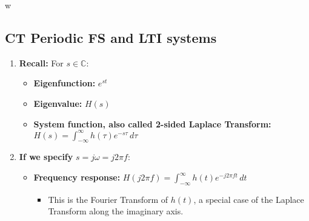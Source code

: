 w\subsection{CT Periodic FS and LTI systems}
\begin{definition}
    
\end{definition}

\begin{derivation}
    \begin{enumerate}
        \item \textbf{Recall:} For \( s \in \mathbb{C} \):

        \begin{center}
        \end{center}
        \begin{itemize}
            \item \textbf{Eigenfunction:} $e^{st}$
            \item \textbf{Eigenvalue:} $H(s)$
            \item \textbf{System function, also called 2-sided Laplace Transform:} $H(s) = \int_{-\infty}^{\infty} h(\tau) e^{-s \tau} \, d\tau$ 
        \end{itemize}

        \item \textbf{If we specify} \( s = j \omega = j 2 \pi f \):

        \begin{center}
        \end{center}
        \begin{itemize}
            \item \textbf{Frequency response:} $H(j 2 \pi f) = \int_{-\infty}^{\infty} h(t) e^{-j 2 \pi f t} \, dt$
            \begin{itemize}
                \item This is the Fourier Transform of \( h(t) \), a special case of the Laplace Transform along the imaginary axis.
            \end{itemize}
        \end{itemize}


\end{enumerate}
\end{derivation}
